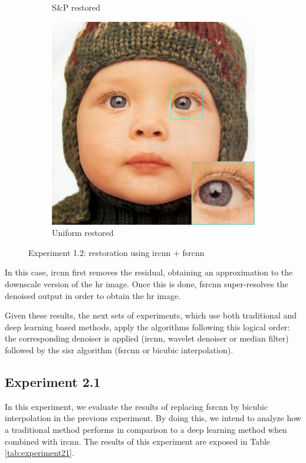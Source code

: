 \begin{figure}
\begin{subfigure}{0.24\textwidth}
		\caption{S\&P restored}
	\end{subfigure}
	\begin{subfigure}{0.24\textwidth}
		\includegraphics[width=\textwidth]{images/exp1.2/uniform.png}
		\caption{Uniform restored}
	\end{subfigure}
	\caption{Experiment 1.2: restoration using \gls{ircnn} $+$ \gls{fsrcnn}}
	\label{fig:exp1.2}
\end{figure}

In this case, \gls{ircnn} first removes the residual, obtaining an approximation to the downscale version of the \gls{hr} image. Once this is done, \gls{fsrcnn} super-resolves the denoised output in order to obtain the \gls{hr} image. 

Given these results, the next sets of experiments, which use both traditional and deep learning based methods, apply the algorithms following this logical order: the corresponding denoiser is applied (\gls{ircnn}, wavelet denoiser or median filter) followed by the \gls{sisr} algorithm (\gls{fsrcnn} or bicubic interpolation).


\subsection{Experiment 2.1}

In this experiment, we evaluate the results of replacing \gls{fsrcnn} by bicubic interpolation in the previous experiment. By doing this, we intend to analyze how a traditional method performs in comparison to a deep learning method when combined with \gls{ircnn}. The results of this experiment are exposed in Table \ref{tab:experiment21}.

